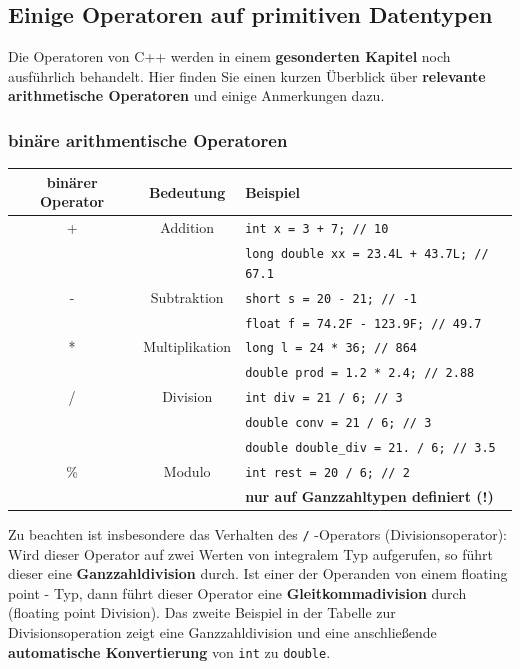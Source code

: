 \documentclass[a4paper]{report}
\begin{document}
%	



\subsection{Einige Operatoren auf primitiven Datentypen}
Die Operatoren von C++ werden in einem \textbf{gesonderten Kapitel} noch ausführlich behandelt. Hier finden Sie einen kurzen Überblick über \textbf{relevante arithmetische Operatoren} und einige Anmerkungen dazu.
\subsubsection{binäre arithmentische Operatoren}
\begin{center}
\begin{tabular}{|c|c|p{8cm}|} \hline
	\textbf{binärer Operator} & \textbf{Bedeutung} & \textbf{Beispiel} \\ \hline
	+ & Addition & \texttt{int x = 3 + 7; // 10} \\
	&& \texttt{long double xx = 23.4L + 43.7L; // 67.1} \\ \hline
	- & Subtraktion & \texttt{short s = 20 - 21; // -1}\\
	&& \texttt{float f = 74.2F - 123.9F; // 49.7} \\ \hline
	* & Multiplikation & \texttt{long l = 24 * 36; // 864}\\
	&& \texttt{double prod = 1.2 * 2.4; // 2.88} \\ \hline
	/ & Division & \texttt{int div = 21 / 6; // 3}\\ 
	&& \texttt{double conv = 21 / 6; // 3} \\
	&& \texttt{double double\_div = 21. / 6; // 3.5} \\ \hline 
	\% & Modulo & \texttt{int rest = 20 / 6; // 2}\\ 
	&& \textbf{nur auf Ganzzahltypen definiert (!)} \\ \hline
\end{tabular}
\end{center}
Zu beachten ist insbesondere das Verhalten des \texttt{/} -Operators (Divisionsoperator): Wird dieser Operator auf zwei Werten von integralem Typ aufgerufen, so führt dieser eine \textbf{Ganzzahldivision} durch. Ist einer der Operanden von einem floating point - Typ, dann führt dieser Operator eine \textbf{Gleitkommadivision} durch (floating point Division). Das zweite Beispiel in der Tabelle zur Divisionsoperation zeigt eine Ganzzahldivision und eine anschließende \textbf{automatische Konvertierung} von \texttt{int} zu \texttt{double}.
\end{document}
